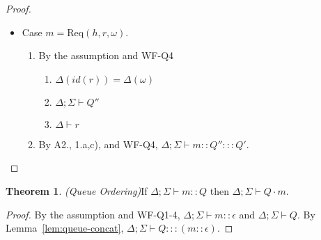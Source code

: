 \documentclass{article}
\theoremstyle{definition}
\newtheorem{thm}{Theorem}[section]
\newcommand{\Req}[3]{\text{Req}(#1, #2, #3)}
\begin{document}
\begin{proof}
\begin{itemize}
\item Case $m = {\Req h r \omega}$.
\begin{enumerate}
\item By the assumption and WF-Q4
  \begin{enumerate}[label=(\alph*)]
  \item $\Delta(id(r)) = \Delta(\omega)$
  \item $\Delta ; \Sigma \vdash Q''$
  \item $\Delta \vdash r$
  \end{enumerate}
\item By A2., 1.a,c), and WF-Q4, $\Delta ; \Sigma \vdash m :: Q'' ::: Q'$.
\end{enumerate}
\end{itemize}
\end{proof}

\begin{thm}
\emph{(Queue Ordering)}\label{lem:queue-ordering}
If $\Delta ; \Sigma \vdash m :: Q$ then $\Delta ; \Sigma \vdash Q \cdot m$.
\end{thm}
\begin{proof}
By the assumption and WF-Q1-4, $\Delta ; \Sigma \vdash m :: \epsilon$ and $\Delta ; \Sigma \vdash Q$. By Lemma~\ref{lem:queue-concat}, $\Delta ; \Sigma \vdash Q ::: (m :: \epsilon)$.
\end{proof}
\end{document}
